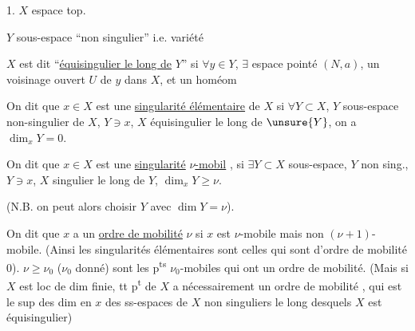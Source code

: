 1. $X$ espace top.

$Y$ sous-espace ``non singulier'' i.e. variété

$X$ est dit ``\uline{équisingulier le long de} $Y$'' si $\forall y\in Y$,  $\exists$ espace pointé $(N,a)$,  un voisinage ouvert $U$ de $y$ dans $X$, et un homéom

On dit que $x\in X$ est une \uline{singularité élémentaire}  de $X$ si $\forall Y\subset X$, $Y$ sous-espace  non-singulier de $X$, $Y\ni x$, $X$ équisingulier  le long de $\unsure{Y}$, on a $\dim_xY=0$.

On dit que $x\in X$ est une \uline{singularité} \uline{$\nu$-mobil} , si $\exists Y\subset X$ sous-espace, $Y$ non sing., $Y\ni x$, $X$ singulier le long de $Y$, $\dim_xY\geq\nu$.

(N.B. on peut alors choisir $Y$ avec $\dim Y=\nu$).


On dit que $x$ a un \uline{ordre de mobilité} $\nu$ si $x$ est $\nu$-mobile mais non $(\nu+1)$-mobile. (Ainsi les singularités élémentaires  sont celles qui sont d'ordre de mobilité 0).    $\nu\geq\nu_0$ ($\nu_0$ donné) sont les p\textsuperscript{ts} $\nu_0$-mobiles qui ont un ordre de mobilité. (Mais si $X$  est loc de dim finie, tt p\textsuperscript{t}  de $X$ a nécessairement un ordre de mobilité , qui est le sup des dim en $x$ des ss-espaces de $X$  non singuliers  le long desquels $X$ est équisingulier)
